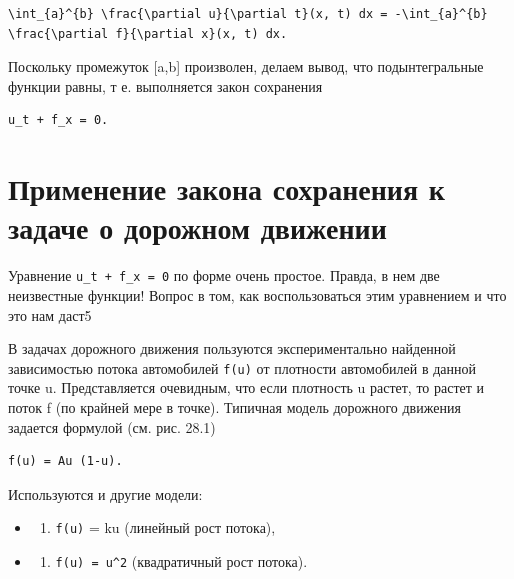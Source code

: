 \documentclass[
  ukrainian,
]{article}
\providecommand{\tightlist}{%
  \setlength{\itemsep}{0pt}\setlength{\parskip}{0pt}}
\begin{document}
\begin{verbatim}
\int_{a}^{b} \frac{\partial u}{\partial t}(x, t) dx = -\int_{a}^{b} \frac{\partial f}{\partial x}(x, t) dx.
\end{verbatim}

Поскольку промежуток {[}a,b{]} произволен, делаем вывод, что
подынтегральные функции равны, т е. выполняется закон сохранения

\begin{verbatim}
u_t + f_x = 0.
\end{verbatim}

\section{Применение закона сохранения к задаче о дорожном
движении}\label{ux43fux440ux438ux43cux435ux43dux435ux43dux438ux435-ux437ux430ux43aux43eux43dux430-ux441ux43eux445ux440ux430ux43dux435ux43dux438ux44f-ux43a-ux437ux430ux434ux430ux447ux435-ux43e-ux434ux43eux440ux43eux436ux43dux43eux43c-ux434ux432ux438ux436ux435ux43dux438ux438}

Уравнение \texttt{u\_t\ +\ f\_x\ =\ 0} по форме очень простое. Правда, в
нем две неизвестные функции! Вопрос в том, как воспользоваться этим
уравнением и что это нам даст5

В задачах дорожного движения пользуются экспериментально найденной
зависимостью потока автомобилей \texttt{f(u)} от плотности автомобилей в
данной точке u. Представляется очевидным, что если плотность u растет,
то растет и поток f (по крайней мере в точке). Типичная модель дорожного
движения задается формулой (см. рис. 28.1)

\begin{verbatim}
f(u) = Au (1-u).
\end{verbatim}

Используются и другие модели:

\begin{itemize}
\tightlist
\item
  \begin{enumerate}
  \def\labelenumi{\arabic{enumi})}
  \tightlist
  \item
    \texttt{f(u)} = ku (линейный рост потока),
  \end{enumerate}
\item
  \begin{enumerate}
  \def\labelenumi{\arabic{enumi})}
  \setcounter{enumi}{1}
  \tightlist
  \item
    \texttt{f(u)\ =\ u\^{}2} (квадратичный рост потока).
  \end{enumerate}
\end{itemize}
\end{document}
